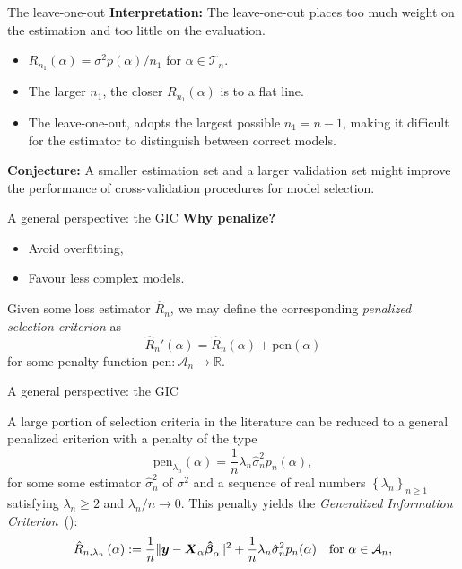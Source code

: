 \documentclass{beamer}
\newcommand{\R}{\mathbb{R}}
\newcommand{\0}{\emptyset}
\newcommand{\paren}[1]{\left(#1 \right)}
\newcommand{\set}[1]{\left\{ #1 \right\}}
\newcommand{\norm}[1]{|\hspace{-1pt}|#1 |\hspace{-1pt}|}
\newcommand{\normsq}[1]{\norm{#1}^{2}}
\newcommand{\Acal}{\mathcal{A}_{n}}
\newcommand{\Tcal}{\mathcal{T}_{n}}
\newcommand{\X}{\boldsymbol{X}}
\newcommand{\y}{\boldsymbol{y}}
\newcommand{\bbetahat}{\boldsymbol{\hat{\beta}}}
\newcommand{\Rhat}[2]{\hat{R}_{n, #1}\paren{#2}}
\newcommand{\sigmahat}{\hat{\sigma}^{2}_{n}}
\newcommand{\pen}[1]{\mathrm{pen}\paren{#1}}
\newcommand{\1}{\mathmybb{1}}
\begin{document}
\begin{frame}{The leave-one-out}
  \textbf{Interpretation: } The leave-one-out places too much weight on the estimation and too little on the evaluation.
  \begin{itemize}
    \item \(R_{n_{1}}(\alpha) = \sigma^{2}p(\alpha)/n_{1}\) for \(\alpha\in\Tcal\).
    \item The larger \(n_{1}\), the closer \(R_{n_{1}}(\alpha)\) is to a flat line.
    \item The leave-one-out, adopts the largest possible \(n_{1}= n-1\), making it difficult for the estimator to distinguish between correct models.
  \end{itemize}  

  \textbf{Conjecture: } A smaller estimation set and a larger validation set might improve the performance of cross-validation procedures for model selection.
\end{frame}

\begin{frame}{A general perspective: the GIC}
  \textbf{Why penalize?}
  \begin{itemize}
    \item Avoid overfitting,
    \item Favour less complex models.
  \end{itemize}

  Given some loss estimator \(\hat{R}_{n}\), we may define the corresponding \emph{penalized selection criterion} as
  \[\hat{R}_{n}'(\alpha) = \hat{R}_{n}(\alpha) + \pen{\alpha}\]
  for some penalty function \(\mathrm{pen}:\Acal\to\R\). 

\end{frame}

\begin{frame}{A general perspective: the GIC}
  
  A large portion of selection criteria in the literature can be reduced to a general penalized criterion with a penalty of the type 
\[\mathrm{pen}_{\lambda_{n}}(\alpha) = \frac{1}{n} \lambda_{n} \sigmahat p_{n}(\alpha),\]
for some some estimator \(\sigmahat\) of \(\sigma^{2}\) and a sequence of real numbers \(\set{\lambda_{n}}_{n\geq 1}\) satisfying \(\lambda_{n}\geq 2\) and \(\lambda_{n}/n\to 0\). This penalty yields the \alert{\emph{Generalized Information Criterion}}~(\cite{shao_1997}):
\[\Rhat{\lambda_{n}}{\alpha} := \frac{1}{n}\normsq{\y - \X_{\alpha}\bbetahat_{\alpha}} + \frac{1}{n}\lambda_{n}\sigmahat p_{n}(\alpha)\quad\text{for }\alpha\in\Acal,\]
\end{frame}
\end{document}
